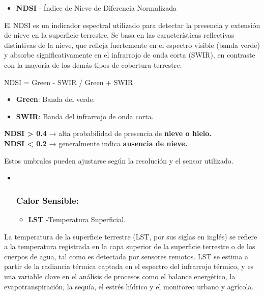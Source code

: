 \documentclass[
]{book}
\providecommand{\tightlist}{%
  \setlength{\itemsep}{0pt}\setlength{\parskip}{0pt}}
\begin{document}
\begin{itemize}
\tightlist
\item
  \textbf{NDSI} - Índice de Nieve de Diferencia Normalizada
\end{itemize}

El NDSI es un indicador espectral utilizado para detectar la presencia y extensión de nieve en la superficie terrestre. Se basa en las características reflectivas distintivas de la nieve, que refleja fuertemente en el espectro visible (banda verde) y absorbe significativamente en el infrarrojo de onda corta (SWIR), en contraste con la mayoría de los demás tipos de cobertura terrestre.

NDSI = Green - SWIR / Green + SWIR\hspace{0pt}

\begin{itemize}
\tightlist
\item
  \textbf{Green}: Banda del verde.\\
\item
  \textbf{SWIR}: Banda del infrarrojo de onda corta.
\end{itemize}

\textbf{NDSI \textgreater{} 0.4} → alta probabilidad de presencia de \textbf{nieve o hielo.}\\
\textbf{NDSI \textless{} 0.2} → generalmente indica \textbf{ausencia de nieve.}

Estos umbrales pueden ajustarse según la resolución y el sensor utilizado.

\begin{itemize}
\item ~
  \subsubsection{\texorpdfstring{\textbf{Calor Sensible:}}{Calor Sensible:}}\label{calor-sensible}

  \begin{itemize}
  \tightlist
  \item
    \textbf{LST} -Temperatura Superficial.
  \end{itemize}
\end{itemize}

La temperatura de la superficie terrestre (LST, por sus siglas en inglés) se refiere a la temperatura registrada en la capa superior de la superficie terrestre o de los cuerpos de agua, tal como es detectada por sensores remotos. LST se estima a partir de la radiancia térmica captada en el espectro del infrarrojo térmico, y es una variable clave en el análisis de procesos como el balance energético, la evapotranspiración, la sequía, el estrés hídrico y el monitoreo urbano y agrícola.
\end{document}
